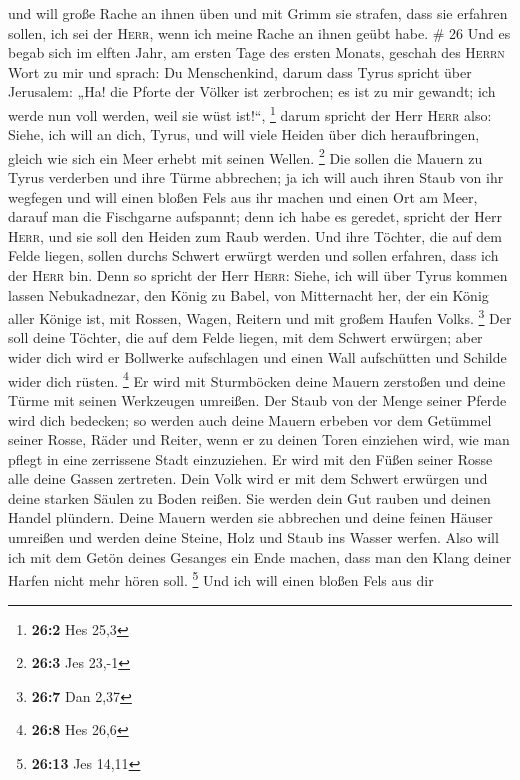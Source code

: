  und will große Rache an ihnen üben und mit Grimm sie
strafen, dass sie erfahren sollen, ich sei der \textsc{Herr}, wenn ich
meine Rache an ihnen geübt habe. \# 26  Und es begab sich
im elften Jahr, am ersten Tage des ersten Monats, geschah des
\textsc{Herrn} Wort zu mir und sprach:  Du Menschenkind,
darum dass Tyrus spricht über Jerusalem: „Ha! die Pforte der Völker ist
zerbrochen; es ist zu mir gewandt; ich werde nun voll werden, weil sie
wüst ist!{}``, \footnote{\textbf{26:2} Hes 25,3}  darum
spricht der Herr \textsc{Herr} also: Siehe, ich will an dich, Tyrus, und
will viele Heiden über dich heraufbringen, gleich wie sich ein Meer
erhebt mit seinen Wellen. \footnote{\textbf{26:3} Jes 23,-1}
 Die sollen die Mauern zu Tyrus verderben und ihre Türme
abbrechen; ja ich will auch ihren Staub von ihr wegfegen und will einen
bloßen Fels aus ihr machen  und einen Ort am Meer, darauf
man die Fischgarne aufspannt; denn ich habe es geredet, spricht der Herr
\textsc{Herr}, und sie soll den Heiden zum Raub werden. 
Und ihre Töchter, die auf dem Felde liegen, sollen durchs Schwert
erwürgt werden und sollen erfahren, dass ich der \textsc{Herr} bin.
 Denn so spricht der Herr \textsc{Herr}: Siehe, ich will
über Tyrus kommen lassen Nebukadnezar, den König zu Babel, von
Mitternacht her, der ein König aller Könige ist, mit Rossen, Wagen,
Reitern und mit großem Haufen Volks. \footnote{\textbf{26:7} Dan 2,37}
 Der soll deine Töchter, die auf dem Felde liegen, mit dem
Schwert erwürgen; aber wider dich wird er Bollwerke aufschlagen und
einen Wall aufschütten und Schilde wider dich rüsten. \footnote{\textbf{26:8}
  Hes 26,6}  Er wird mit Sturmböcken deine Mauern
zerstoßen und deine Türme mit seinen Werkzeugen umreißen.
 Der Staub von der Menge seiner Pferde wird dich
bedecken; so werden auch deine Mauern erbeben vor dem Getümmel seiner
Rosse, Räder und Reiter, wenn er zu deinen Toren einziehen wird, wie man
pflegt in eine zerrissene Stadt einzuziehen.  Er wird mit
den Füßen seiner Rosse alle deine Gassen zertreten. Dein Volk wird er
mit dem Schwert erwürgen und deine starken Säulen zu Boden reißen.
 Sie werden dein Gut rauben und deinen Handel plündern.
Deine Mauern werden sie abbrechen und deine feinen Häuser umreißen und
werden deine Steine, Holz und Staub ins Wasser werfen. 
Also will ich mit dem Getön deines Gesanges ein Ende machen, dass man
den Klang deiner Harfen nicht mehr hören soll. \footnote{\textbf{26:13}
  Jes 14,11}  Und ich will einen bloßen Fels aus dir
